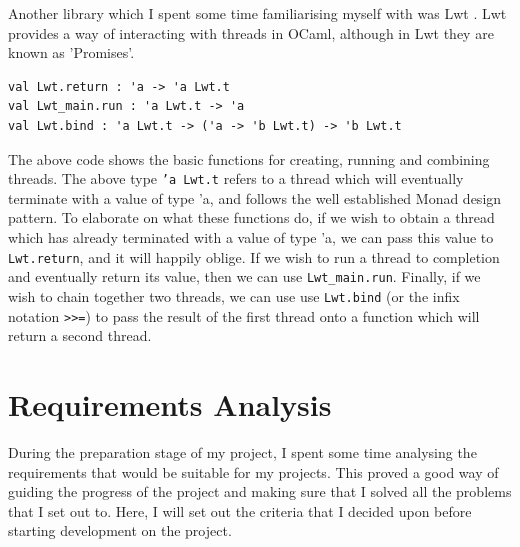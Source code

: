 \documentclass[12pt,a4paper,twoside,openright]{report}
\begin{document}
		Another library which I spent some time familiarising myself with was Lwt \cite{Lwt}. 
		Lwt provides a way of interacting with threads in OCaml, although in Lwt they are known as 'Promises'.
		\begin{lstlisting}
val Lwt.return : 'a -> 'a Lwt.t 
val Lwt_main.run : 'a Lwt.t -> 'a
val Lwt.bind : 'a Lwt.t -> ('a -> 'b Lwt.t) -> 'b Lwt.t
		\end{lstlisting}
		The above code shows the basic functions for creating, running and combining threads.
		The above type \texttt{'a Lwt.t} refers to a thread which will eventually terminate with a value of type 'a, and follows the well established Monad design pattern.
		To elaborate on what these functions do, if we wish to obtain a thread which has already terminated with a value of type 'a, we can pass this value to \texttt{Lwt.return}, and it will happily oblige. If we wish to run a thread to completion and eventually return its value, then we can use \texttt{Lwt\_main.run}. Finally, if we wish to chain together two threads, we can use use \texttt{Lwt.bind} (or the infix notation \texttt{>>=}) to pass the result of the first thread onto a function which will return a second thread.

	\section{Requirements Analysis}
	During the preparation stage of my project, I spent some time analysing the requirements that would be suitable for my projects. This proved a good way of guiding the progress of the project and making sure that I solved all the problems that I set out to. Here, I will set out the criteria that I decided upon before starting development on the project.
\end{document}
